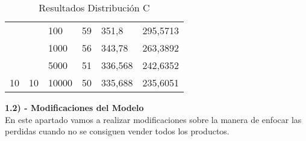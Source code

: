\documentclass{article}
\begin{document}
\begin{table}[h]
\begin{tabular}{llllll}
			\multicolumn{1}{|l|}{}                                                 & \multicolumn{1}{l|}{}                                                 & \multicolumn{1}{l|}{100}                                                  & \multicolumn{1}{l|}{59}                                                      & \multicolumn{1}{l|}{351,8}                                                          & \multicolumn{1}{l|}{295,5713}                                                         \\ \cline{3-6} 
			\multicolumn{1}{|l|}{}                                                 & \multicolumn{1}{l|}{}                                                 & \multicolumn{1}{l|}{1000}                                                 & \multicolumn{1}{l|}{56}                                                      & \multicolumn{1}{l|}{343,78}                                                         & \multicolumn{1}{l|}{263,3892}                                                         \\ \cline{3-6} 
			\multicolumn{1}{|l|}{}                                                 & \multicolumn{1}{l|}{}                                                 & \multicolumn{1}{l|}{5000}                                                 & \multicolumn{1}{l|}{51}                                                      & \multicolumn{1}{l|}{336,568}                                                        & \multicolumn{1}{l|}{242,6352}                                                         \\ \cline{3-6} 
			\multicolumn{1}{|l|}{\multirow{-4}{*}{10}}                             & \multicolumn{1}{l|}{\multirow{-4}{*}{10}}                             & \multicolumn{1}{l|}{10000}                                                & \multicolumn{1}{l|}{50}                                                      & \multicolumn{1}{l|}{335,688}                                                        & \multicolumn{1}{l|}{235,6051}                                                         \\ \hline
		\end{tabular}
	\caption{Resultados Distribución C}
	\end{table}
	
	\newpage


	\Large \textbf{1.2) - Modificaciones del Modelo} \\
	
	\normalsize En este apartado vamos a realizar modificaciones sobre la manera de enfocar las perdidas cuando no se consiguen vender todos los productos. \\
	
\end{document}
